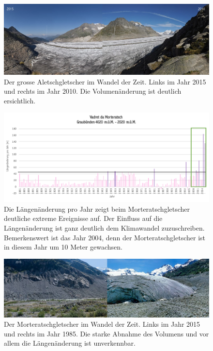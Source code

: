 \begin{refsection}
\begin{figure}
\centering
\includegraphics[width=1.0\textwidth]{extrem/Aletsch.jpg}
\caption{Der grosse Aletschgletscher im Wandel der Zeit. Links im Jahr 2015 und rechts im Jahr 2010. Die Volumenänderung ist deutlich ersichtlich.}
\label{Aletsch}
\end{figure}


\begin{figure}
\centering
\includegraphics[width=1.0\textwidth]{extrem/Morteratsch.pdf}
\caption{Die Längenänderung pro Jahr zeigt beim Morteratschgletscher deutliche extreme Ereignisse auf. Der Einfluss auf die Längenänderung ist ganz deutlich dem Klimawandel zuzuschreiben. Bemerkenswert ist das Jahr 2004, denn der Morteratschgletscher ist in diesem Jahr um 10 Meter gewachsen.}
\label{Morteratschtab}
\end{figure}


\begin{figure}
\centering
\includegraphics[width=1.0\textwidth]{extrem/Morteratsch.jpg}
\caption{Der Morteratschgletscher im Wandel der Zeit. Links im Jahr 2015 und rechts im Jahr 1985. Die starke Abnahme des Volumens und vor allem die Längenänderung ist unverkennbar.}
\label{Morteratsch}
\end{figure}






\printbibliography[heading=subbibliography]
\end{refsection}
